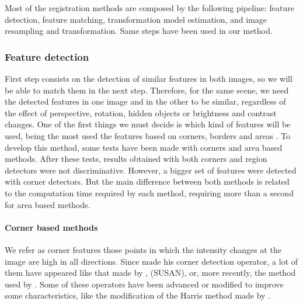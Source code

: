 Most of the registration methods are composed by the following pipeline: feature detection, feature matching, transformation model estimation, and image resampling and transformation. Same steps have been used in our method.

\subsubsection{Feature detection}\label{ch:chapter01_01_02_01}

First step consists on the detection of similar features in both images, so we will be able to match them in the next step. Therefore, for the same scene, we need the detected features in one image and in the other to be similar, regardless of the effect of perspective, rotation, hidden objects or brightness and contrast changes. One of the first things we must decide is which kind of features will be used, being the most used the features based on corners, borders and areas \citep{li2008comprehensive}. To develop this method, some tests have been made with corners and area based methods. After these tests, results obtained with both corners and region detectors were not discriminative. However, a bigger set of features were detected with corner detectors. But the main difference between both methods is related to the computation time required by each method, requiring more than a second for area based methods.

\paragraph{Corner based methods}\label{ch:chapter01_01_02_01_01}

We refer as corner features those points in which the intensity changes at the image are high in all directions. Since \cite{hans1977towards} made his corner detection operator, a lot of them have appeared like that made by \cite{harris1988combined}, \cite{smith1997susan} (SUSAN), or, more recently, the method used by \cite{rosten2006machine}. Some of these operators have been advanced or modified to improve some characteristics, like the modification of the Harris method made by \cite{shi1994good}.

